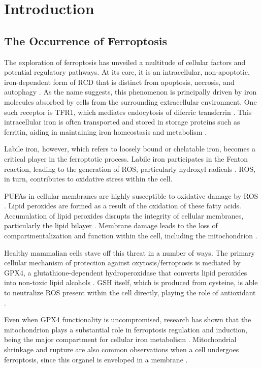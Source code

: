 \chapter[Introduction]%
{Introduction}

\section{The Occurrence of Ferroptosis}

The exploration of ferroptosis has unveiled a multitude of cellular factors and potential regulatory pathways. At its core, it is an intracellular, non-apoptotic, iron-dependent form of \ac{RCD} that is distinct from apoptosis, necrosis, and autophagy \citep{ferro_cd}. As the name suggests, this phenomenon is principally driven by iron molecules absorbed by cells from the surrounding extracellular environment. One such receptor is \ac{TFR1}, which mediates endocytosis of diferric transferrin \citep{tfr1}. This intracellular iron is often transported and stored in storage proteins such as ferritin, aiding in maintaining iron homeostasis and metabolism \citep{ferritin}.

Labile iron, however, which refers to loosely bound or chelatable iron, becomes a critical player in the ferroptotic process. Labile iron participates in the Fenton reaction, leading to the generation of \ac{ROS}, particularly hydroxyl radicals \citep{labile_iron}. \acs{ROS}, in turn, contributes to oxidative stress within the cell. 

\Acp{PUFA} in cellular membranes are highly susceptible to oxidative damage by \acs{ROS} \citep{lpperox}. Lipid peroxides are formed as a result of the oxidation of these fatty acids. Accumulation of lipid peroxides disrupts the integrity of cellular membranes, particularly the lipid bilayer \citep{lppmembrane}. Membrane damage leads to the loss of compartmentalization and function within the cell, including the mitochondrion \citep{lppmito}.

Healthy mammalian cells stave off this threat in a number of ways. The primary cellular mechanism of protection against oxytosis/ferroptosis is mediated by \ac{GPX4}, a glutathione-dependent hydroperoxidase that converts lipid peroxides into non-toxic lipid alcohols \citep{gpx4}. \ac{GSH} itself, which is produced from cysteine, is able to neutralize \acs{ROS} present within the cell directly, playing the role of antioxidant \citep{glutath}. 

Even when \acs{GPX4} functionality is uncompromised, research has shown that the mitochondrion plays a substantial role in ferroptosis regulation and induction, being the major compartment for cellular iron metabolism \citep{mito_ferro2}. Mitochondrial shrinkage and rupture are also common observations when a cell undergoes ferroptosis, since this organel is enveloped in a membrane \citep{mito_ferro}.

